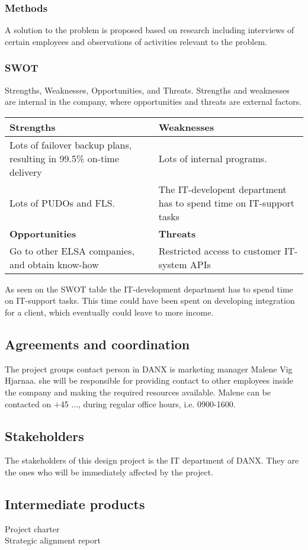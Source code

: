 \subsubsection{Methods}
A solution to the problem is proposed based on research including interviews of certain employees and observations of activities relevant to the problem.


\subsubsection{SWOT}
Strengths, Weaknesses, Opportunities, and Threats.
Strengths and weaknesses are internal in the company, where opportunities and threats are external factors.

\begin{table}[htdp]
\label{SWOT analysis}
\begin{tabular}{| p{} | p{} |}
\hline
\rowcolor{GR}
\textbf{Strengths} & \textbf{Weaknesses} \\ \hline \hline
Lots of failover backup plans, resulting in 99.5\% on-time delivery & Lots of internal programs.
\\ \hline
Lots of PUDOs and FLS. & The IT-developent department has to spend time on IT-support tasks \\ \hline \hline
\rowcolor{GR}
\textbf{Opportunities} & \textbf{Threats} \\ \hline
Go to other ELSA companies, and obtain know-how & Restricted access to customer IT-system APIs \\ \hline
\end{tabular}
\end{table}

As seen on the SWOT table the IT-development department has to spend time on IT-support tasks. This time could have been spent on developing integration for a client, which eventually could leave to more income.

\subsection{Agreements and coordination}
The project groups contact person in DANX is marketing manager Malene Vig Hjarnaa. she will be responsible for providing contact to other employees inside the company and making the required resources available. Malene can be contacted on +45 ..., during regular office hours, i.e. 0900-1600.

\subsection{Stakeholders}
The stakeholders of this design project is the IT department of DANX. They are the ones who will be immediately affected by the project.

\subsection{Intermediate products}
\begin{description}
	\item[Project charter] 
	\item[Strategic alignment report] 
\end{description}